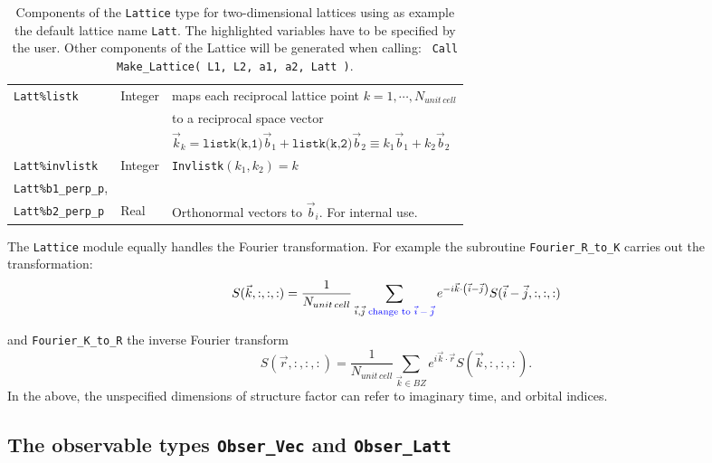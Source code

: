 \begin{table}[h]
\begin{tabular}{l l l}
    \texttt{Latt\%listk}                                           &  Integer &  maps each reciprocal lattice point $k=1,\cdots, N_{unit\,cell}$\\
                                                                          &    & to a reciprocal space vector\\
                                                                          &     & $\vec{k}_k= \texttt{listk(k,1)} \vec{b}_1 +  \texttt{listk(k,2)} \vec{b}_2  \equiv k_1  \vec{b}_1 +   k_2  \vec{b}_2 $\\
    \texttt{Latt\%invlistk}                                     &    Integer    &   \texttt{Invlistk}$(k_1,k_2) = k $ \\
   \texttt{Latt\%b1\_perp\_p},  \\ 
   \texttt{Latt\%b2\_perp\_p}                             &    Real         &  Orthonormal vectors to $\vec{b}_i$.  For internal use. 
   \end{tabular}
   \caption{Components of the \texttt{Lattice} type for two-dimensional lattices using as example the default lattice name \texttt{Latt}.
   The highlighted variables have to be specified by the user.  Other components of the Lattice will be generated  when calling: \texttt{ Call Make\_Lattice( L1, L2, a1,  a2, Latt )}.  
    \label{table:lattice}}
\end{table}
%
The \texttt{Lattice}  module equally handles  the Fourier transformation.  For example  the  subroutine  \texttt{Fourier\_R\_to\_K}   carries out the  transformation: 
\begin{equation}
	S(\vec{k}, :,:,:) =  \frac{1}{N_{unit \,cell}}  \sum_{\vec{i},\vec{j} \;\text{{\color{blue} change to $\vec{i}-\vec{j}$}}}   e^{-i \vec{k} \cdot \left( \vec{i}-\vec{j} \right)} S(\vec{i}  - \vec{j}, :,:,:)
\end{equation}

and  \texttt{Fourier\_K\_to\_R}  the  inverse Fourier transform 
 \begin{equation}
	S(\vec{r}, :,:,:) =  \frac{1}{N_{unit \,cell}}  \sum_{\vec{k} \in BZ }   e^{ i \vec{k} \cdot \vec{r}} S(\vec{k}, :,:,:).
\end{equation}
In the above,   the unspecified dimensions of   structure factor can refer  to imaginary time,  and orbital indices. 


\subsection{The observable types \texttt{Obser\_Vec} and \texttt{Obser\_Latt}}\label{sec:obs}

